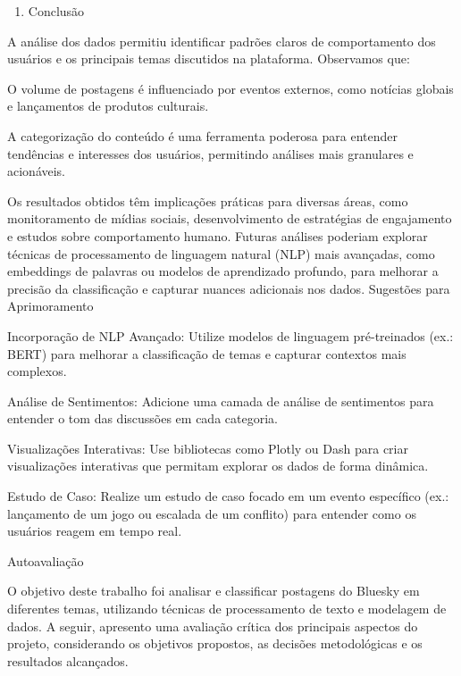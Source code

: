 \documentclass[
  letterpaper,
  DIV=11,
  numbers=noendperiod]{scrartcl}
\providecommand{\tightlist}{%
  \setlength{\itemsep}{0pt}\setlength{\parskip}{0pt}}\usepackage{longtable,booktabs,array}
\begin{document}
\begin{enumerate}
\def\labelenumi{\Roman{enumi}.}
\setcounter{enumi}{3}
\tightlist
\item
  Conclusão
\end{enumerate}

A análise dos dados permitiu identificar padrões claros de comportamento
dos usuários e os principais temas discutidos na plataforma. Observamos
que:

\begin{VerbatimWithBreaks}
O volume de postagens é influenciado por eventos externos, como notícias globais e lançamentos de produtos culturais. 

A categorização do conteúdo é uma ferramenta poderosa para entender tendências e interesses dos usuários, permitindo análises mais granulares e acionáveis. 
 
\end{VerbatimWithBreaks}

Os resultados obtidos têm implicações práticas para diversas áreas, como
monitoramento de mídias sociais, desenvolvimento de estratégias de
engajamento e estudos sobre comportamento humano. Futuras análises
poderiam explorar técnicas de processamento de linguagem natural (NLP)
mais avançadas, como embeddings de palavras ou modelos de aprendizado
profundo, para melhorar a precisão da classificação e capturar nuances
adicionais nos dados. Sugestões para Aprimoramento

\begin{VerbatimWithBreaks}
Incorporação de NLP Avançado:  Utilize modelos de linguagem pré-treinados (ex.: BERT) para melhorar a classificação de temas e capturar contextos mais complexos. 

Análise de Sentimentos:  Adicione uma camada de análise de sentimentos para entender o tom das discussões em cada categoria. 

Visualizações Interativas:  Use bibliotecas como Plotly ou Dash para criar visualizações interativas que permitam explorar os dados de forma dinâmica. 

Estudo de Caso:  Realize um estudo de caso focado em um evento específico (ex.: lançamento de um jogo ou escalada de um conflito) para entender como os usuários reagem em tempo real. 
 
\end{VerbatimWithBreaks}

Autoavaliação

O objetivo deste trabalho foi analisar e classificar postagens do
Bluesky em diferentes temas, utilizando técnicas de processamento de
texto e modelagem de dados. A seguir, apresento uma avaliação crítica
dos principais aspectos do projeto, considerando os objetivos propostos,
as decisões metodológicas e os resultados alcançados.
\end{document}

